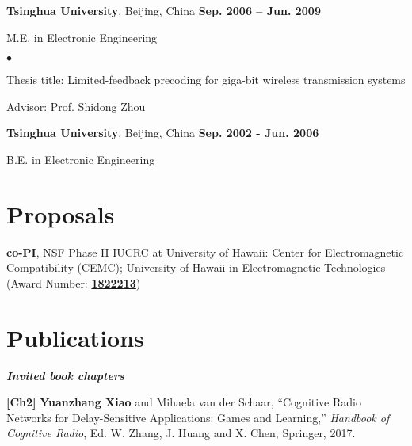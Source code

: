 \documentclass[margin,line]{res}
\newenvironment{list1}{
  \begin{list}{\ding{113}}{%
      \setlength{\itemsep}{0in}
      \setlength{\parsep}{0in} \setlength{\parskip}{0in}
      \setlength{\topsep}{0in} \setlength{\partopsep}{0in}
      \setlength{\leftmargin}{0.17in}}}{\end{list}}
\newenvironment{list2}{
  \begin{list}{$\bullet$}{%
      \setlength{\itemsep}{0in}
      \setlength{\parsep}{0in} \setlength{\parskip}{0in}
      \setlength{\topsep}{0in} \setlength{\partopsep}{0in}
      \setlength{\leftmargin}{0.2in}}}{\end{list}}
\begin{document}
\begin{resume}
{\bf Tsinghua University}, Beijing, China \hfill {\bf
Sep. 2006 -- Jun. 2009}\\
\vspace*{-.1in}
\begin{list1}
\item[] M.E. in Electronic Engineering
\begin{list2}
\vspace*{.05in}
\item Thesis title: Limited-feedback precoding for giga-bit wireless transmission systems
\item Advisor: Prof. Shidong Zhou
\end{list2}
\end{list1}

{\bf Tsinghua University}, Beijing, China \hfill {\bf
Sep. 2002 - Jun. 2006}\\
\vspace*{-.1in}
\begin{list1}
\item[] B.E. in Electronic Engineering
\end{list1}





\section{\sc Proposals}
{\bf co-PI}, NSF Phase II IUCRC at University of Hawaii: Center for Electromagnetic Compatibility (CEMC); University of Hawaii in Electromagnetic Technologies (Award Number: \href{https://nsf.gov/awardsearch/showAward?AWD_ID=1822213&HistoricalAwards=false}{\textbf{1822213}})




\section{\sc Publications}

%

{\em \textbf{Invited book chapters}}

\vspace{-.3cm}

\textbf{[Ch2]} {\bf Yuanzhang Xiao} and Mihaela van der Schaar, ``Cognitive Radio Networks for Delay-Sensitive Applications: Games and Learning,'' \emph{Handbook of Cognitive Radio}, Ed. W. Zhang, J. Huang and X. Chen, Springer, 2017.


\end{resume}
\end{document}
